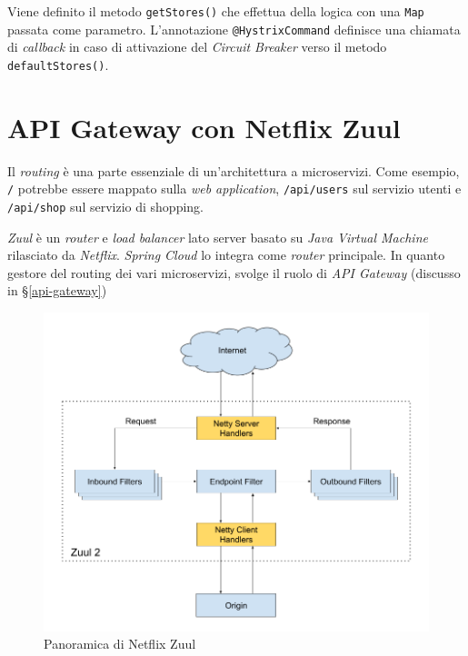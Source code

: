 Viene definito il metodo \texttt{getStores()} che effettua della logica con una \texttt{Map} passata come parametro.
L'annotazione \texttt{@HystrixCommand} definisce una chiamata di \textit{callback} in caso di attivazione del \textit{Circuit Breaker} verso il metodo \texttt{defaultStores()}.



\section{API Gateway con Netflix Zuul}

Il \textit{routing} è una parte essenziale di un'architettura a microservizi. Come esempio, \texttt{/} potrebbe essere mappato sulla \textit{web application}, \texttt{/api/users} sul servizio utenti e \texttt{/api/shop} sul servizio di shopping.

\textit{Zuul} è un \textit{router} e \textit{load balancer} lato server basato su \textit{Java Virtual Machine} rilasciato da \textit{Netflix}. \textit{Spring Cloud} lo integra come \textit{router} principale. In quanto gestore del routing dei vari microservizi, svolge il ruolo di \textit{API Gateway} (discusso in \S\ref{api-gateway})

\begin{figure}[H]
	\centering
	\includegraphics[width=\textwidth]{immagini/zuul.png}
	\caption[Panoramica di Netflix Zuul]{Panoramica di Netflix Zuul\footnotemark}
	\label{netflix-zuul}
\end{figure}

